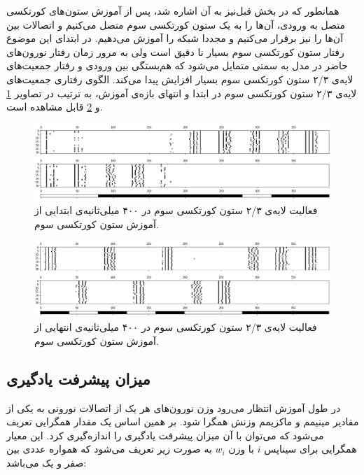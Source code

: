 \documentclass[12pt]{report}
\begin{document}
	همانطور که در بخش قبل‌نیز به آن اشاره شد، پس از آموزش ستون‌های کورتکسی متصل به ورودی، آن‌ها را به یک ستون کورتکسی سوم متصل می‌کنیم و اتصالات بین آن‌ها را نیز برقرار می‌کنیم و مجددا شبکه را آموزش می‌دهیم. در ابتدای این موضوع رفتار ستون کورتکسی سوم بسیار نا دقیق است ولی به مرور زمان رفتار نورون‌های حاضر در مدل به سمتی متمایل می‌شود که هم‌بستگی بین ورودی و رفتار جمعیت‌های لایه‌ی ۲/۳ ستون کورتکسی سوم بسیار افزایش پیدا می‌کند. الگوی رفتاری جمعیت‌های لایه‌ی ۲/۳ ستون کورتکسی سوم در ابتدا و انتهای بازه‌ی آموزش، به ترتیب در تصاویر ‌\ref{fig:c3-begining} و \ref{fig:c3-final} قابل مشاهده است.
	
	\begin{figure}[H]
		\centering
		\includegraphics[width=1.0\linewidth]{c3-begining.png}
		\caption[NS]{
			فعالیت لایه‌ی ۲/۳ ستون کورتکسی سوم در ۴۰۰ میلی‌ثانیه‌ی ابتدایی از آموزش ستون کورتکسی سوم.
		}
		\label{fig:c3-begining} 
	\end{figure}

\begin{figure}[H]
	\centering
	\includegraphics[width=1.0\linewidth]{c3-final.png}
	\caption[NS]{
	فعالیت لایه‌ی ۲/۳ ستون کورتکسی سوم در ۴۰۰ میلی‌ثانیه‌ی انتهایی از آموزش ستون کورتکسی سوم.
	}
	\label{fig:c3-final} 
\end{figure}
	
	\subsection{میزان پیشرفت یادگیری}
	
	در طول آموزش انتظار می‌رود وزن نورون‌های هر یک از اتصالات نورونی به یکی از مقادیر مینیمم و ماکزیمم وزنش همگرا شود. بر همین اساس یک مقدار همگرایی تعریف می‌شود که می‌توان با آن میزان پیشرفت یادگیری را اندازه‌گیری کرد. این معیار همگرایی برای سیناپس $i$ با وزن $w_i$ به صورت زیر تعریف می‌شود که همواره عددی بین صفر و یک می‌باشد:
	
\end{document}
